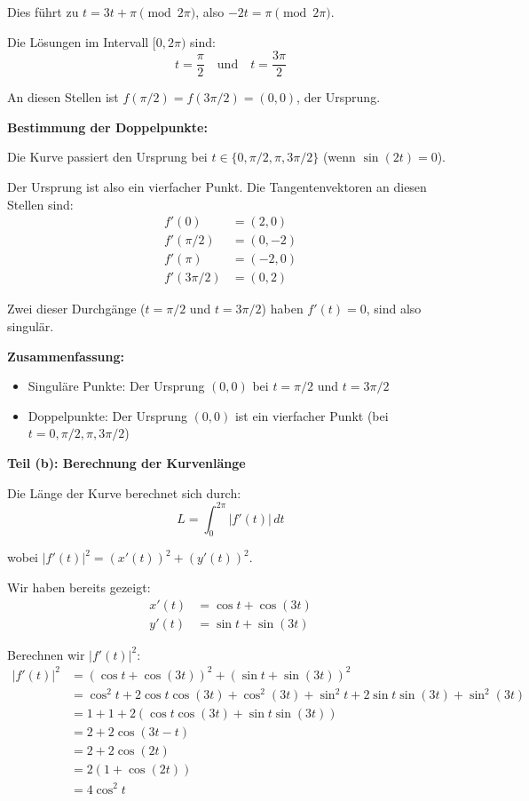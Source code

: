 \documentclass{article}
\begin{document}
Dies führt zu $t = 3t + \pi \pmod{2\pi}$, also $-2t = \pi \pmod{2\pi}$.

Die Lösungen im Intervall $[0, 2\pi)$ sind:
$$t = \frac{\pi}{2} \quad \text{und} \quad t = \frac{3\pi}{2}$$

An diesen Stellen ist $f(\pi/2) = f(3\pi/2) = (0,0)$, der Ursprung.

\textbf{Bestimmung der Doppelpunkte:}

Die Kurve passiert den Ursprung bei $t \in \{0, \pi/2, \pi, 3\pi/2\}$ (wenn $\sin(2t) = 0$).

Der Ursprung ist also ein vierfacher Punkt. Die Tangentenvektoren an diesen Stellen sind:
\begin{align}
f'(0) &= (2, 0)\\
f'(\pi/2) &= (0, -2)\\
f'(\pi) &= (-2, 0)\\
f'(3\pi/2) &= (0, 2)
\end{align}

Zwei dieser Durchgänge ($t = \pi/2$ und $t = 3\pi/2$) haben $f'(t) = 0$, sind also singulär.

\textbf{Zusammenfassung:}
\begin{itemize}
\item Singuläre Punkte: Der Ursprung $(0,0)$ bei $t = \pi/2$ und $t = 3\pi/2$
\item Doppelpunkte: Der Ursprung $(0,0)$ ist ein vierfacher Punkt (bei $t = 0, \pi/2, \pi, 3\pi/2$)
\end{itemize}

\textbf{Teil (b): Berechnung der Kurvenlänge}

Die Länge der Kurve berechnet sich durch:
$$L = \int_0^{2\pi} |f'(t)| \, dt$$

wobei $|f'(t)|^2 = (x'(t))^2 + (y'(t))^2$.

Wir haben bereits gezeigt:
\begin{align}
x'(t) &= \cos t + \cos(3t)\\
y'(t) &= \sin t + \sin(3t)
\end{align}

Berechnen wir $|f'(t)|^2$:
\begin{align}
|f'(t)|^2 &= (\cos t + \cos(3t))^2 + (\sin t + \sin(3t))^2\\
&= \cos^2 t + 2\cos t \cos(3t) + \cos^2(3t) + \sin^2 t + 2\sin t \sin(3t) + \sin^2(3t)\\
&= 1 + 1 + 2(\cos t \cos(3t) + \sin t \sin(3t))\\
&= 2 + 2\cos(3t - t)\\
&= 2 + 2\cos(2t)\\
&= 2(1 + \cos(2t))\\
&= 4\cos^2 t
\end{align}
\end{document}
